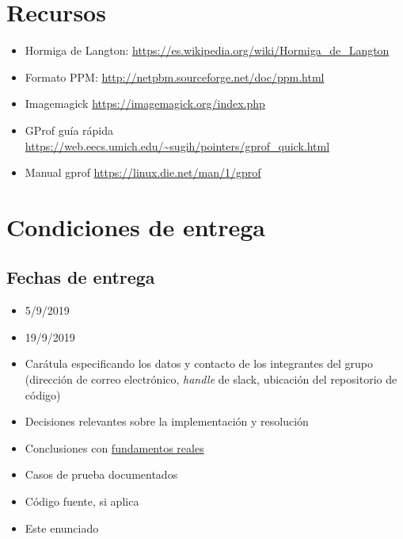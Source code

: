 \documentclass{article}
\begin{document}
\pagebreak
\section{Recursos}\label{Recursos}

\begin{itemize}
\item Hormiga de Langton: \url{https://es.wikipedia.org/wiki/Hormiga_de_Langton}
\item Formato PPM: \url{http://netpbm.sourceforge.net/doc/ppm.html}
\item Imagemagick \url{https://imagemagick.org/index.php}
\item GProf guía rápida \url{https://web.eecs.umich.edu/~sugih/pointers/gprof_quick.html}
\item Manual gprof \url{https://linux.die.net/man/1/gprof}
\end{itemize}

\section{Condiciones de entrega}

\subsection{Fechas de entrega}
\begin{itemize}
\item 5/9/2019
\item 19/9/2019
\end{itemize}

\begin{itemize}
\item Carátula especificando los datos y contacto de los integrantes del grupo (dirección de correo electrónico, 
\textit{handle} de slack, ubicación del repositorio de código)
\item Decisiones relevantes sobre la implementación y resolución
\item Conclusiones con \underline{fundamentos reales}
\item Casos de prueba documentados
\item Código fuente, si aplica
\item Este enunciado
\end{itemize}
\end{document}
